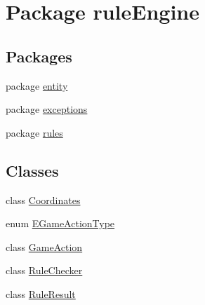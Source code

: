 \hypertarget{namespacerule_engine}{}\section{Package rule\+Engine}
\label{namespacerule_engine}
\subsection*{Packages}
\begin{DoxyCompactItemize}
\item 
package \mbox{\hyperlink{namespacerule_engine_1_1entity}{entity}}
\item 
package \mbox{\hyperlink{namespacerule_engine_1_1exceptions}{exceptions}}
\item 
package \mbox{\hyperlink{namespacerule_engine_1_1rules}{rules}}
\end{DoxyCompactItemize}
\subsection*{Classes}
\begin{DoxyCompactItemize}
\item 
class \mbox{\hyperlink{classrule_engine_1_1_coordinates}{Coordinates}}
\item 
enum \mbox{\hyperlink{enumrule_engine_1_1_e_game_action_type}{E\+Game\+Action\+Type}}
\item 
class \mbox{\hyperlink{classrule_engine_1_1_game_action}{Game\+Action}}
\item 
class \mbox{\hyperlink{classrule_engine_1_1_rule_checker}{Rule\+Checker}}
\item 
class \mbox{\hyperlink{classrule_engine_1_1_rule_result}{Rule\+Result}}
\end{DoxyCompactItemize}
